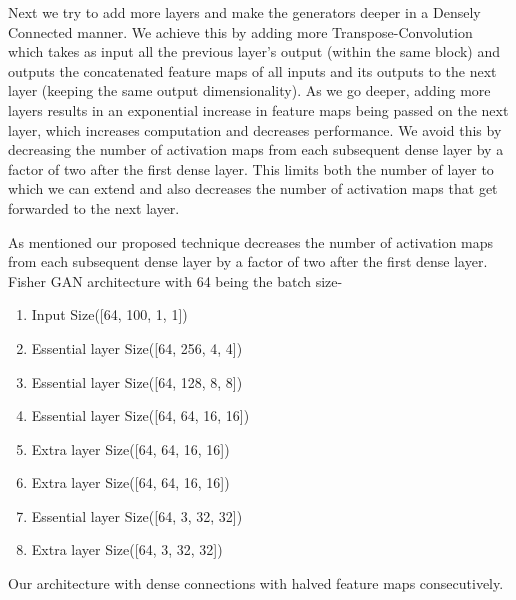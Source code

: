 \documentclass{article}
\begin{document}
Next we try to add more layers and make the generators deeper in a Densely Connected manner. We achieve this by adding more Transpose-Convolution which takes as input all the previous layer’s output (within the same block) and outputs the concatenated feature maps of all inputs and its outputs to the next layer (keeping the same output dimensionality). As we go deeper, adding more layers results in an exponential increase in feature maps being passed on the next layer, which increases computation and decreases performance. We avoid this by decreasing the number of activation maps from each subsequent dense layer by a factor of two after the first dense layer. This limits both the number of layer to which we can extend and also decreases the number of activation maps that get forwarded to the next layer.

As mentioned our proposed technique decreases the number of activation maps from each subsequent dense layer by a factor of two after the first dense layer. Fisher GAN architecture with 64 being the batch size-
\begin{enumerate}
    \item Input Size([64, 100, 1, 1])
    \item Essential layer Size([64, 256, 4, 4])
    \item Essential layer Size([64, 128, 8, 8])
    \item Essential layer Size([64, 64, 16, 16])
    \item Extra layer Size([64, 64, 16, 16])
    \item Extra layer Size([64, 64, 16, 16])
    \item Essential layer Size([64, 3, 32, 32])
    \item Extra layer Size([64, 3, 32, 32])
\end{enumerate}
Our architecture with dense connections with halved feature maps consecutively.
\end{document}
